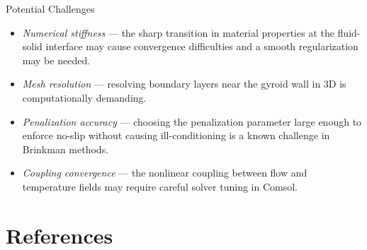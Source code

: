 \documentclass{beamer}
\begin{document}
	
	\begin{frame}{Potential Challenges}
		\begin{itemize}
			\item \emph{Numerical stiffness} — the sharp transition in material properties
			at the fluid-solid interface may cause convergence difficulties and 
			a smooth regularization may be needed.
			\pause
			\item \emph{Mesh resolution} — resolving boundary layers near the 
			gyroid wall in 3D is computationally demanding.
			\pause
			\item \emph{Penalization accuracy} — choosing the penalization parameter large enough 
			to enforce no-slip without causing ill-conditioning is a known 
			challenge in Brinkman methods.
			\pause
			\item \emph{Coupling convergence} — the nonlinear coupling between 
			flow and temperature fields may require careful solver tuning 
			in Comsol.
		\end{itemize}
	\end{frame}
	
	
	\section{References}
	
	\begin{frame}[allowframebreaks]
		
		

	\end{frame}
\end{document}
